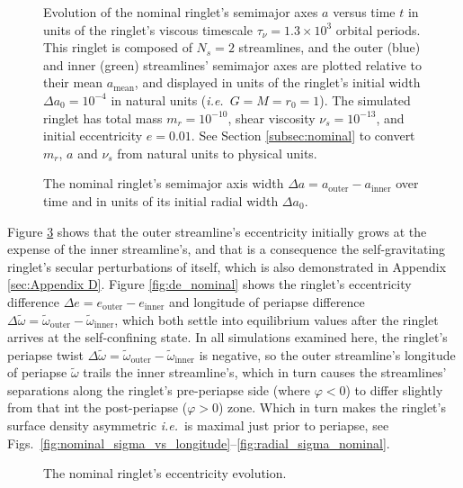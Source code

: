 \documentclass[preprint]{aastex62}
\begin{document}
\begin{figure}
\caption{Evolution of the nominal ringlet's semimajor axes $a$
versus time $t$ in units of the ringlet's viscous timescale
$\tau_\nu=1.3\times10^3$ orbital periods. This ringlet is composed of $N_s=2$ streamlines,
and the outer (blue) and inner (green) streamlines' semimajor axes are plotted relative
to their mean $a_{\text{mean}}$, and displayed in units of the ringlet's
initial width $\Delta a_0 = 10^{-4}$ in natural units ({\it i.e.}\ $G=M=r_0=1$).
The simulated ringlet has total mass $m_r=10^{-10}$, shear viscosity $\nu_s=10^{-13}$,
and initial eccentricity $e=0.01$. See Section \ref{subsec:nominal} to convert
$m_r$, $a$ and $\nu_s$ from natural units to physical units.
\label{fig:a_nominal}}
\end{figure}

\begin{figure}
\caption{
\label{fig:da_nominal}
The nominal ringlet's semimajor axis width $\Delta a = a_{\text{outer}} - a_{\text{inner}}$ over time
and in units of its initial radial width $\Delta a_0$.}
\end{figure}

Figure \ref{fig:e_nominal} shows that the outer streamline's eccentricity initially grows at the
expense of the inner streamline's, and that is a consequence the self-gravitating ringlet's
secular perturbations of itself, which is also demonstrated in Appendix \ref{sec:Appendix D}. 
Figure \ref{fig:de_nominal} shows
the ringlet's eccentricity difference $\Delta e = e_{\text{outer}} - e_{\text{inner}}$
and longitude of periapse difference
$\Delta\tilde{\omega} = \tilde{\omega}_{\text{outer}} - \tilde{\omega}_{\text{inner}}$,
which both settle into equilibrium values after the ringlet arrives at the self-confining
state. In all simulations examined here, the ringlet's periapse twist 
$\Delta\tilde{\omega} = \tilde{\omega}_{\text{outer}} - \tilde{\omega}_{\text{inner}}$ is negative,
so the outer streamline's longitude of periapse $\tilde{\omega}$ trails
the inner streamline's, which in turn causes the streamlines' separations along
the ringlet's pre-periapse side (where $\varphi < 0$) to differ slightly from that int the post-periapse ($\varphi>0$) zone.
Which in turn makes the ringlet's surface density asymmetric {\it i.e.}\ is
maximal just prior to periapse, see
Figs.\ \ref{fig:nominal_sigma_vs_longitude}--\ref{fig:radial_sigma_nominal}.

\begin{figure}
\caption{
\label{fig:e_nominal}
The nominal ringlet's eccentricity evolution.}
\end{figure}
\end{document}
